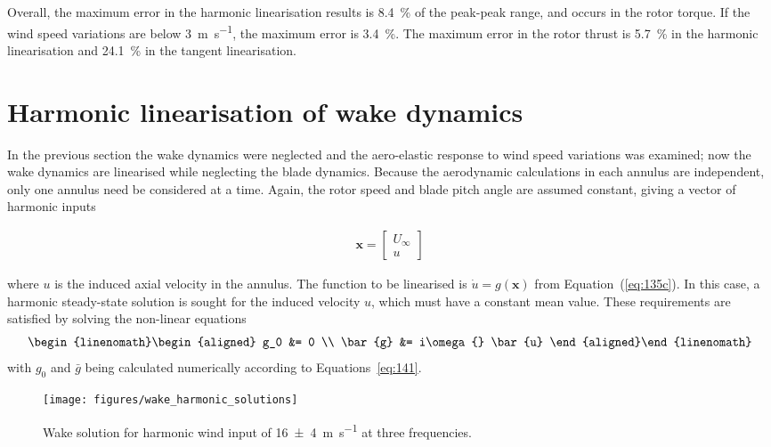 \documentclass[preprint]{elsarticle}
\begin{document}
Overall, the maximum error in the harmonic linearisation results is \SI{8.4}{\%}
of the peak-peak range, and occurs in the rotor torque. If the wind speed
variations are below \SI{3}{\metre\per\second}, the maximum error is
\SI{3.4}{\%}. The maximum error in the rotor thrust is \SI{5.7}{\%} in the
harmonic linearisation and \SI{24.1}{\%} in the tangent linearisation.

\section{Harmonic linearisation of wake dynamics}
\label{sec:lin-wake}

In the previous section the wake dynamics were neglected and the aero-elastic
response to wind speed variations was examined; now the wake dynamics are
linearised while neglecting the blade dynamics. Because the aerodynamic
calculations in each annulus are independent, only one annulus need be
considered at a time. Again, the rotor speed and blade pitch angle are assumed
constant, giving a vector of harmonic inputs
\begin{linenomath}\begin{align}
  \label{eq:155}
  \boldsymbol{x} = \begin{bmatrix}
    U_\infty{} \\ u
  \end{bmatrix}
\end{align}\end{linenomath}
where $u$ is the induced axial velocity in the annulus. The function to be
linearised is $\dot{u} = g(\mathbf{x})$ from Equation~(\ref{eq:135c}). In this
case, a harmonic steady-state solution is sought for the induced velocity $u$,
which must have a constant mean value. These requirements are satisfied by
solving the non-linear equations
\begin{subequations}
  \label{eq:156}
  \begin{linenomath}\begin{align}
    g_0 &= 0 \\
    \bar{g} &= i\omega{} \bar{u}
  \end{align}\end{linenomath}
\end{subequations}
with $g_0$ and $\bar{g}$ being calculated numerically according to
Equations~\eqref{eq:141}.

\begin{figure}
  \centering
  \hspace*{-1cm}\texttt{[image: figures/wake\_harmonic\_solutions]}
  \caption{Wake solution for harmonic wind input of
    \SI[separate-uncertainty = true]{16+-4}{\metre\per\second} at three frequencies.%
  }
\label{fig:wake-examples}
\end{figure}
\end{document}

